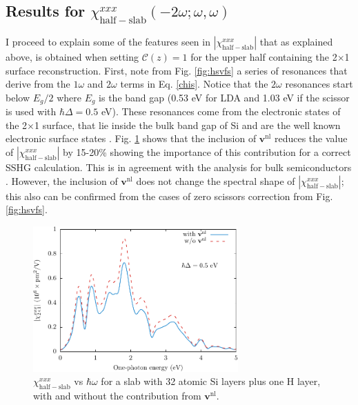 {%

\subsection{
\texorpdfstring{Results for $\chi^{xxx}_{\mathrm{half-slab}}
(-2\omega;\omega,\omega)$}
{Results for Xxxx(half-slab)(-2w;w,w)}}

I proceed to explain some of the features seen in
$|\chi^{xxx}_{\mathrm{half-slab}}|$ that as explained above, is obtained when
setting ${\mathbf{\mathcal{C}}}(z)=1$ for the upper half containing the
2$\times$1 surface reconstruction. First, note from Fig. \ref{fig:hsvfs} a
series of resonances that derive from the $1\omega$ and $2\omega$ terms in Eq.
\eqref{chis}. Notice that the $2\omega$ resonances start below $E_{g}/2$ where
$E_{g}$ is the band gap (0.53 eV for LDA and 1.03 eV if the scissor is used with
$\hbar\Delta=0.5$ eV). These resonances come from the electronic states of the
2$\times$1 surface, that lie inside the bulk band gap of Si and are the well
known electronic surface states \cite{rohlfingPRB95}. Fig. \ref{fig:vnl} shows
that the inclusion of $\mathbf{v}^\mathrm{nl}$ reduces the value of
$|\chi^{xxx}_{\mathrm{half-slab}}|$ by 15-20\% showing the importance of this
contribution for a correct SSHG calculation. This is in agreement with the
analysis for bulk semiconductors \cite{luppiPRB08}. However, the inclusion of
$\mathbf{v}^\mathrm{nl}$ does not change the spectral shape of
$|\chi^{xxx}_{\mathrm{half-slab}}|$; this also can be confirmed from the cases
of zero scissors correction from Fig. \ref{fig:hsvfs}.

\begin{figure}
\centering 
\includegraphics[width=0.7\textwidth]{figures/fig-4_1_04}
\caption{$\chi^{xxx}_{\mathrm{half-slab}}$ vs $\hbar\omega$ for a slab with 32
atomic Si layers plus one H layer, with and without the contribution from
$\mathbf{v}^\mathrm{nl}$.}
\label{fig:vnl}
\end{figure}

}

